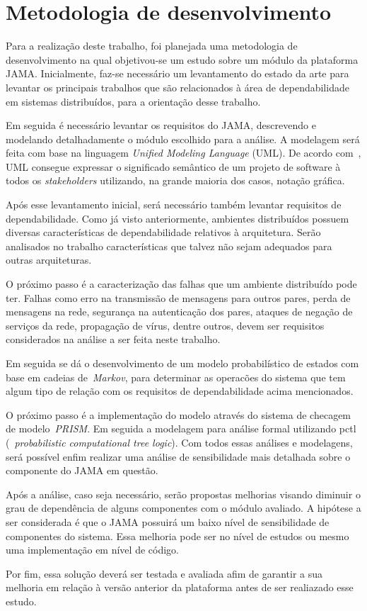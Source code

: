 \chapter{Metodologia de desenvolvimento}

Para a realização deste trabalho, foi planejada uma metodologia de desenvolvimento na qual objetivou-se um estudo sobre um módulo da plataforma JAMA. Inicialmente, faz-se necessário um levantamento do estado da arte para levantar os principais trabalhos que são relacionados à área de dependabilidade em sistemas distribuídos, para a orientação desse trabalho.

Em seguida é necessário levantar os requisitos do JAMA, descrevendo e modelando detalhadamente o módulo escolhido para a análise. A modelagem será feita com base na linguagem \emph{Unified Modeling Language} (UML). De acordo com~\cite{larman08}, UML consegue expressar o significado semântico de um projeto de software à todos os \emph{stakeholders} utilizando, na grande maioria dos casos, notação gráfica.

Após esse levantamento inicial, será necessário também levantar requisitos de dependabilidade.  Como já visto anteriormente, ambientes distribuídos possuem diversas características de dependabilidade relativos à arquitetura. Serão analisados no trabalho características que talvez não sejam adequados para outras arquiteturas.

O próximo passo é a caracterização das falhas que um ambiente distribuído pode ter. Falhas como erro na transmissão de mensagens para outros pares, perda de mensagens na rede, segurança na autenticação dos pares, ataques de negação de serviços da rede, propagação de vírus, dentre outros, devem ser requisitos considerados na análise a ser feita neste trabalho.

Em seguida se dá o desenvolvimento de um modelo probabilístico de estados com base em cadeias de~\emph{Markov}, para determinar as operacões do sistema que tem algum tipo de relação com os requisitos de dependabilidade acima mencionados.

O próximo passo é a implementação do modelo através do sistema de checagem de modelo~\emph{PRISM}. Em seguida a modelagem para análise formal utilizando pctl (~\emph{probabilistic computational tree logic}). Com todos essas análises e modelagens, será possível enfim realizar uma análise de sensibilidade mais detalhada sobre o componente do JAMA em questão.

Após a análise, caso seja necessário, serão propostas melhorias visando diminuir o grau de dependência de alguns componentes com o módulo avaliado. A hipótese a ser considerada é que o JAMA possuirá um baixo nível de sensibilidade de componentes do sistema. Essa melhoria pode ser no nível de estudos ou mesmo uma implementação em nível de código.

Por fim, essa solução deverá ser testada e avaliada afim de garantir a sua melhoria em relação à versão anterior da plataforma antes de ser realiazado esse estudo.
